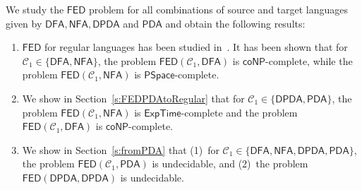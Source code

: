 \documentclass{CSML}
\newcommand{\PSPACE}{\textsf{PSpace}}
\newcommand{\EXPTIME}{\textsf{ExpTime}}
\newcommand{\coNP}{\textsf{coNP}}
\newcommand{\undecidable}{undecidable}
\newcommand{\class}{\mathcal{C}}
\newcommand{\DFA}{\mathsf{DFA}}
\newcommand{\NFA}{\mathsf{NFA}}
\newcommand{\PDA}{\mathsf{PDA}}
\newcommand{\DPDA}{\mathsf{DPDA}}
\newcommand{\TED}{\mathsf{TED}}
\newcommand{\FED}{\mathsf{FED}}
\begin{document}
\begin{comment}
Table~\ref{tab:complexityOfTED} summarizes the complexity of the $\TED$ problem.

\begin{table}
\centering
\begin{tabular}{|c|c|c|}
\hline
& $\class_2 \in \{ \DFA, \NFA\}$  & $\class_2 \in \{ \DPDA, \PDA\}$ \\
\hline
$\class_1 \in \{ \DFA, \NFA\}$ & \PSPACE-c~\cite{riveros}  &  \multirow{2}{*}{\textbf{\undecidable{} (Prop.~\ref{p:undecidable} and Th.~\ref{th:fromDPDAUndecidable})}}\\
\cline{1-2}
$\class_1 \in \{  \DPDA, \PDA\}$ & \textbf{{\EXPTIME-c (Th.~\ref{th:mainTED})}}  & \\
\hline
\end{tabular}
\caption{Complexity of $\TED(\class_1, \class_2)$ with references to the results.}
\label{tab:complexityOfTED}
\end{table}
\end{comment}

\noindent We study the $\FED$ problem for all combinations of 
source and target languages given by $\DFA, \NFA, \DPDA$ and $\PDA$ and obtain the following results:
\begin{enumerate}
\item $\FED$ for regular languages has been studied in~\cite{boundedRiveros}.
It has been shown that for $\class_1 \in \{ \DFA,\NFA\}$, the problem 
$\FED(\class_1,\DFA)$ is $\coNP$-complete, while the problem
$\FED(\class_1,\NFA)$ is $\PSPACE$-complete.
\item We show in Section~\ref{s:FEDPDAtoRegular} that for $\class_1 \in \{ \DPDA,\PDA\}$, 
the problem $\FED(\class_1,\NFA)$ is $\EXPTIME$-complete and
the problem $\FED(\class_1,\DFA)$ is $\coNP$-complete.
\item We show in Section~\ref{s:fromPDA} that
(1)~for $\class_1 \in \{\DFA, \NFA,\DPDA, \PDA\}$, the problem $\FED(\class_1, \PDA)$ is undecidable, and
(2)~the problem $\FED(\DPDA, \DPDA)$ is undecidable.
\end{enumerate}
\end{document}
